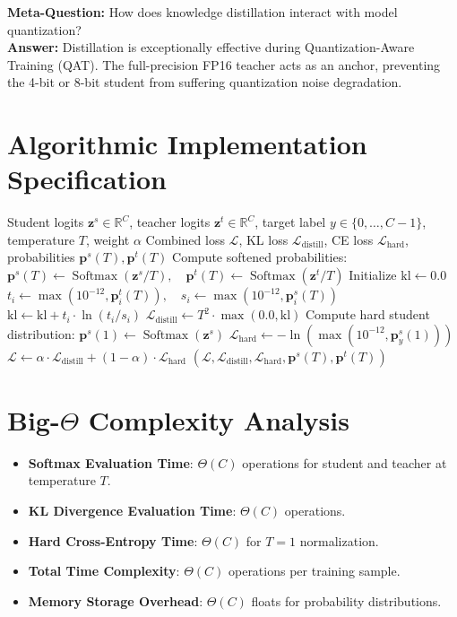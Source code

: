 \documentclass[11pt,a4paper]{article}
\theoremstyle{definition}
\begin{document}
\textbf{Meta-Question:} How does knowledge distillation interact with model quantization?\\
\textbf{Answer:} Distillation is exceptionally effective during Quantization-Aware Training (QAT). The full-precision FP16 teacher acts as an anchor, preventing the 4-bit or 8-bit student from suffering quantization noise degradation.

\section{Algorithmic Implementation Specification}

\begin{algorithm}[H]
\caption{Soft-Target Knowledge Distillation Loss Evaluation}
\begin{algorithmic}[1]
\Require Student logits $\mathbf{z}^s \in \mathbb{R}^C$, teacher logits $\mathbf{z}^t \in \mathbb{R}^C$, target label $y \in \{0, \dots, C-1\}$, temperature $T$, weight $\alpha$
\Ensure Combined loss $\mathcal{L}$, KL loss $\mathcal{L}_{\text{distill}}$, CE loss $\mathcal{L}_{\text{hard}}$, probabilities $\mathbf{p}^s(T), \mathbf{p}^t(T)$
\State Compute softened probabilities:
\State $\mathbf{p}^s(T) \gets \operatorname{Softmax}(\mathbf{z}^s / T), \quad \mathbf{p}^t(T) \gets \operatorname{Softmax}(\mathbf{z}^t / T)$
\State Initialize $\text{kl} \gets 0.0$
    \State $t_i \gets \max(10^{-12}, \mathbf{p}^t_i(T)), \quad s_i \gets \max(10^{-12}, \mathbf{p}^s_i(T))$
    \State $\text{kl} \gets \text{kl} + t_i \cdot \ln(t_i / s_i)$
\EndFor
\State $\mathcal{L}_{\text{distill}} \gets T^2 \cdot \max(0.0, \text{kl})$
\State Compute hard student distribution: $\mathbf{p}^s(1) \gets \operatorname{Softmax}(\mathbf{z}^s)$
\State $\mathcal{L}_{\text{hard}} \gets -\ln(\max(10^{-12}, \mathbf{p}^s_y(1)))$
\State $\mathcal{L} \gets \alpha \cdot \mathcal{L}_{\text{distill}} + (1 - \alpha) \cdot \mathcal{L}_{\text{hard}}$
\State \Return $(\mathcal{L}, \mathcal{L}_{\text{distill}}, \mathcal{L}_{\text{hard}}, \mathbf{p}^s(T), \mathbf{p}^t(T))$
\end{algorithmic}
\end{algorithm}

\section{Big-$\Theta$ Complexity Analysis}

\begin{itemize}
    \item \textbf{Softmax Evaluation Time}: $\Theta(C)$ operations for student and teacher at temperature $T$.
    \item \textbf{KL Divergence Evaluation Time}: $\Theta(C)$ operations.
    \item \textbf{Hard Cross-Entropy Time}: $\Theta(C)$ for $T=1$ normalization.
    \item \textbf{Total Time Complexity}: $\Theta(C)$ operations per training sample.
    \item \textbf{Memory Storage Overhead}: $\Theta(C)$ floats for probability distributions.
\end{itemize}
\end{document}
